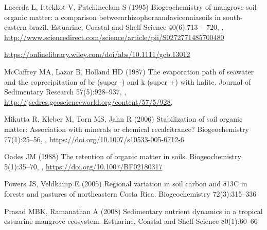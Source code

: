 \begin{thebibliography}{29}
Lacerda L, Ittekkot V, Patchineelam S (1995) Biogeochemistry of mangrove soil
  organic matter: a comparison betweenrhizophoraandavicenniasoils in
  south-eastern brazil. Estuarine, Coastal and Shelf Science 40(6):713 -- 720,
  ,
  \urlprefix\url{http://www.sciencedirect.com/science/article/pii/S0272771485700480}

\DIFaddbegin {}
  \DIFadd{,
  }\urlprefix\url{https://onlinelibrary.wiley.com/doi/abs/10.1111/gcb.13012}\DIFadd{,
  }

\DIFaddend {}
McCaffrey MA, Lazar B, Holland HD (1987) The evaporation path of seawater and
  the coprecipitation of br (super -) and k (super +) with halite. Journal of
  Sedimentary Research 57(5):928--937,
  ,
  \urlprefix\url{http://jsedres.geoscienceworld.org/content/57/5/928},

Mikutta R, Kleber M, Torn MS, Jahn R (2006) Stabilization of soil organic
  matter: Association with minerals or chemical recalcitrance? Biogeochemistry
  77(1):25--56, ,
  \urlprefix\url{https://doi.org/10.1007/s10533-005-0712-6}

Oades JM (1988) The retention of organic matter in soils. Biogeochemistry
  5(1):35--70, ,
  \urlprefix\url{https://doi.org/10.1007/BF02180317}

Powers JS, Veldkamp E (2005) {Regional variation in soil carbon and $\delta$13C
  in forests and pastures of northeastern Costa Rica}. Biogeochemistry
  72(3):315--336

Prasad MBK, Ramanathan A (2008) {Sedimentary nutrient dynamics in a tropical
  estuarine mangrove ecosystem}. {Estuarine, Coastal and Shelf Science}
  80(1):60--66


\end{thebibliography}
